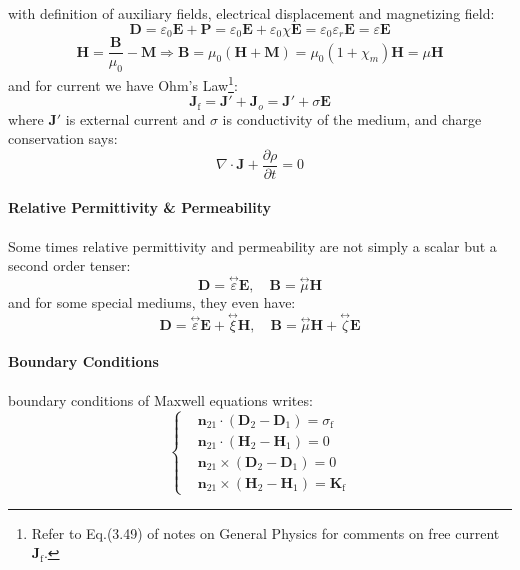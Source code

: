 \documentclass[11pt,a4paper,oneside]{book}
\begin{document}
with definition of auxiliary fields, electrical displacement and magnetizing field:
\begin{equation}\label{DE}
	\mathbf{D}=\varepsilon_0\mathbf{E}+\mathbf{P}=\varepsilon_0\mathbf{E}+\varepsilon_0\chi\mathbf{E}=\varepsilon_0\varepsilon_r\mathbf{E}=\varepsilon\mathbf{E}
\end{equation}
\begin{equation}\label{HB}
	\mathbf{H}=\frac{\mathbf{B}}{\mu_0}-\mathbf{M}\Rightarrow \mathbf{B}=\mu_0(\mathbf{H}+\mathbf{M})=\mu_0(1+\chi_m)\mathbf{H}=\mu\mathbf{H}
\end{equation}
and for current we have Ohm's Law\footnote{Refer to Eq.(3.49) of notes on General Physics for comments on free current $\mathbf{J}_\text{f}$.}:
\begin{equation}
	\mathbf{J}_\text{f}=\mathbf{J}'+\mathbf{J}_o=\mathbf{J}'+\sigma\mathbf{E}
\end{equation}
where $\mathbf{J}'$ is external current and $\sigma$ is conductivity of the medium, and charge conservation says:
\begin{equation}
	\nabla\cdot\mathbf{J}+\frac{\partial \rho}{\partial t}=0
\end{equation}
\paragraph{Relative Permittivity \& Permeability} Some times relative permittivity and permeability are not simply a scalar but a second order tenser:\begin{equation}
	\mathbf{D}=\stackrel{\leftrightarrow}{\varepsilon}\mathbf{E},\quad\mathbf{B}=\stackrel{\leftrightarrow}{\mu}\mathbf{H}
\end{equation}
and for some special mediums, they even have:\begin{equation}
	\mathbf{D}=\stackrel{\leftrightarrow}{\varepsilon}\mathbf{E}+\stackrel{\leftrightarrow}{\xi}\mathbf{H},\quad\mathbf{B}=\stackrel{\leftrightarrow}{\mu}\mathbf{H}+\stackrel{\leftrightarrow}{\zeta}\mathbf{E}
\end{equation}
\paragraph{Boundary Conditions} boundary conditions of Maxwell equations writes:\begin{equation}\left\{
	\begin{aligned}
		&\mathbf{n}_{21}\cdot\left(\mathbf{D}_2-\mathbf{D}_1 \right)=\sigma_\text{f}\\
		&\mathbf{n}_{21}\cdot\left(\mathbf{H}_2-\mathbf{H}_1 \right)=0\\
		&\mathbf{n}_{21}\times\left(\mathbf{D}_2-\mathbf{D}_1 \right)=0\\
		&\mathbf{n}_{21}\times\left(\mathbf{H}_2-\mathbf{H}_1 \right)=\mathbf{K}_\text{f}
	\end{aligned}\right.
\end{equation}
\end{document}
